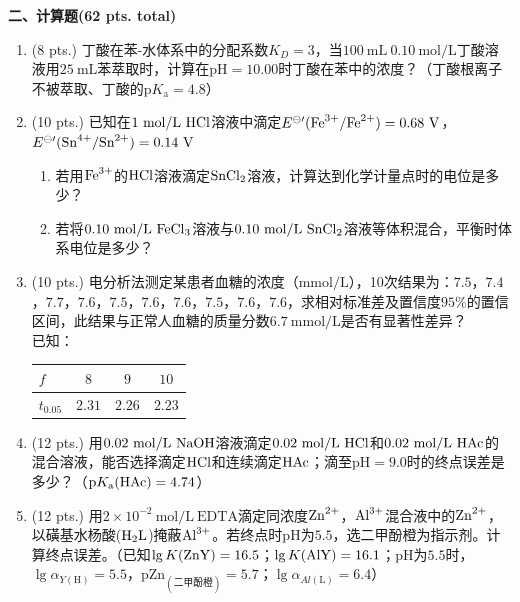 \vspace{0.5cm}
\noindent\textbf{二、计算题(62 pts. total)}

\begin{enumerate}[label=\arabic*., itemsep=1.5ex]
    \item (8 pts.) 丁酸在苯-水体系中的分配系数$K_D=3$，当$100\ \mathrm{mL}\ 0.10\ \mathrm{mol/L}$丁酸溶液用$25\ \mathrm{mL}$苯萃取时，计算在$\mathrm{pH}=10.00$时丁酸在苯中的浓度？（丁酸根离子不被萃取、丁酸的$\mathrm{p}K_\mathrm{a}=4.8$）
    \item (10 pts.) 已知在$1\ \mathrm{mol/L}\ \ce{HCl}$溶液中滴定$E^{\ominus\prime}(\ce{Fe^{3+}/Fe^{2+}})=0.68\ \mathrm{V}$，$E^{\ominus\prime}(\ce{Sn^{4+}/Sn^{2+}})=0.14\ \mathrm{V}$
    \begin{enumerate}[label=(\arabic*), noitemsep, topsep=0pt, partopsep=0pt]
        \item 若用$\ce{Fe^{3+}}$的$\ce{HCl}$溶液滴定$\ce{SnCl2}$溶液，计算达到化学计量点时的电位是多少？
        \item 若将$0.10\ \mathrm{mol/L}\ \ce{FeCl3}$溶液与$0.10\ \mathrm{mol/L}\ \ce{SnCl2}$溶液等体积混合，平衡时体系电位是多少？
    \end{enumerate}
    \item (10 pts.) 电分析法测定某患者血糖的浓度（$\mathrm{mmol/L}$），10次结果为：$7.5$，$7.4$，$7.7$，$7.6$，$7.5$，$7.6$，$7.6$，$7.5$，$7.6$，$7.6$，求相对标准差及置信度$95\%$的置信区间，此结果与正常人血糖的质量分数$6.7\ \mathrm{mmol/L}$是否有显著性差异？
    \\
    已知：
    \begin{center}
    \begin{tabular}{l|ccc}
    $f$ & $8$ & $9$ & $10$ \\
    \hline
    $t_{0.05}$ & $2.31$ & $2.26$ & $2.23$ \\
    \end{tabular}
    \end{center}
    \item (12 pts.) 用$0.02\ \mathrm{mol/L}\ \ce{NaOH}$溶液滴定$0.02\ \mathrm{mol/L}\ \ce{HCl}$和$0.02\ \mathrm{mol/L}\ \ce{HAc}$的混合溶液，能否选择滴定$\ce{HCl}$和连续滴定$\ce{HAc}$；滴至$\mathrm{pH}=9.0$时的终点误差是多少？（$\mathrm{p}K_\mathrm{a}(\ce{HAc})=4.74$）
    \item (12 pts.) 用$2\times10^{-2}\ \mathrm{mol/L}\ \mathrm{EDTA}$滴定同浓度$\ce{Zn^{2+}}$，$\ce{Al^{3+}}$混合液中的$\ce{Zn^{2+}}$，以磺基水杨酸($\ce{H2L}$)掩蔽$\ce{Al^{3+}}$。若终点时$\mathrm{pH}$为$5.5$，选二甲酚橙为指示剂。计算终点误差。（已知$\lg K(\ce{ZnY})=16.5$；$\lg K(\ce{AlY})=16.1$；$\mathrm{pH}$为$5.5$时，$\lg\alpha_{Y(\mathrm{H})}=5.5$，$\mathrm{pZn_{(二甲酚橙)}}=5.7$；$\lg\alpha_{Al(\mathrm{L})}=6.4$）

\end{enumerate}
